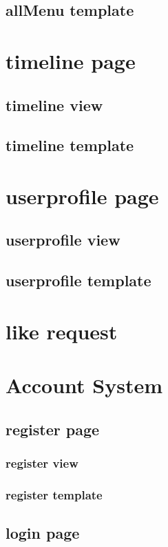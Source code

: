 \subsection{allMenu template}

\section{timeline page}
\subsection{timeline view}
\subsection{timeline template}

\section{userprofile page}
\subsection{userprofile view}
\subsection{userprofile template}

\section{like request}

\section{Account System} \label{spez:AccountSystem}
\subsection{register page}
\subsubsection{register view}
\subsubsection{register template}

\subsection{login page}
